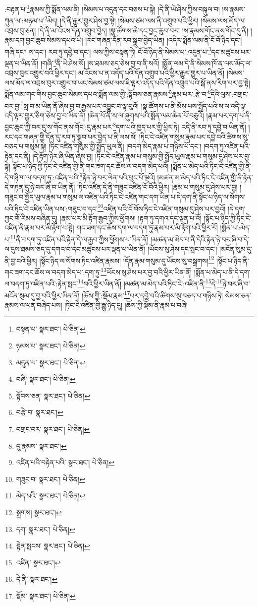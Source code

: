 :བརྟན་པ་\footnote{བསྟན་པ་  སྣར་ཐང་།  པེ་ཅིན། }རྣམས་ཀྱི་སྨོན་ལམ་ནི། །སེམས་པ་འདུན་དང་བཅས་པ་སྟེ། །དེ་ནི་ཡེ་ཤེས་ཀྱིས་བསྐུལ་བ། །ས་རྣམས་ཀུན་ལ་:མཉམ་པ་\footnote{ཉམས་པ་  སྣར་ཐང་།  པེ་ཅིན། }མེད། །དེ་ནི་རྒྱུར་གྱུར་ཤེས་བྱ་སྟེ། །སེམས་ཙམ་ལས་ནི་འགྲུབ་པའི་ཕྱིར། །སེམས་ལས་མོད་ལ་འབྲས་བུ་ཅན། །དེ་ནི་མ་འོངས་དོན་འགྲུབ་བྱེད། །སྣ་ཚོགས་ཆེ་དང་བྱང་ཆུབ་བར། །ས་རྣམས་གོང་ནས་གོང་དུ་ནི། །
རྣམ་དག་བྱང་ཆུབ་སེམས་དཔའ་ཡི། །རང་གཞན་དོན་རབ་སྒྲུབ་བྱེད་ཡིན། །འདིར་སྨོན་ལམ་ནི་ངོ་བོ་ཉིད་དང་། གཞི་དང་། ས་དང་། རབ་ཏུ་དབྱེ་བ་དང་། ལས་ཀྱིས་བསྟན་ཏེ། ངོ་བོ་ཉིད་ནི་སེམས་པ་:འདུན་པ་\footnote{མདུན་པ་  སྣར་ཐང་།  པེ་ཅིན། }དང་མཚུངས་པར་ལྡན་པ་ཡིན་ནོ། །གཞི་\footnote{བཞི་  སྣར་ཐང་།  པེ་ཅིན། }ནི་ཡེ་ཤེས་སོ། །ས་ཐམས་ཅད་ཅེས་བྱ་བ་ནི་སའོ། །སྨོན་ལམ་དེ་ནི་སེམས་ཁོ་ན་ལས་མོད་ལ་འབྲས་བུར་འགྱུར་བའི་ཕྱིར་དང་། མ་འོངས་པ་ན་འདོད་པའི་དོན་འགྲུབ་པའི་ཕྱིར་རྒྱུར་གྱུར་པ་ཡིན་ནོ། །སེམས་ལས་མོད་ལ་འབྲས་བུར་འགྱུར་བ་ཡང་སེམས་ཙམ་ལས་ཇི་ལྟར་འདོད་པའི་དོན་འགྲུབ་པའི་སྒོ་ནས་རིག་པར་བྱ་སྟེ། སྨོན་ལམ་གང་གིས་བྱང་ཆུབ་སེམས་དཔའ་སྨོན་ལམ་གྱི་:སྟོབས་ཅན་རྣམས་\footnote{སྟོབས་ཅན་  སྣར་ཐང་།  པེ་ཅིན། }རྣམ་པར་:རྩེ་བ་\footnote{བརྩེ་བ་  སྣར་ཐང་། }དེའི་ལུས་:བགྲང་བར་བྱ་\footnote{བགྲང་བར་  སྣར་ཐང་།  པེ་ཅིན། }སླ་བ་མ་ཡིན་ནོ་ཞེས་བྱ་བ་རྒྱས་པར་འབྱུང་བ་ལྟ་བུའོ། །སྣ་ཚོགས་པ་ནི་མོས་པས་སྤྱོད་པའི་ས་ལ་འདི་ལྟ་འདི་ལྟར་གྱུར་ཅིག་ཅེས་བྱ་བ་ཡིན་ནོ། །ཆེན་པོ་ནི་ས་ལ་ཞུགས་པའི་སྨོན་ལམ་ཆེན་པོ་བཅུའོ། །རྣམ་པར་དག་པ་ནི་བྱང་ཆུབ་ཀྱི་བར་དུ་ས་གོང་ནས་གོང་:དུ་རྣམ་པར་\footnote{དུ་རྣམས་  སྣར་ཐང་། }དག་པའི་ཁྱད་པར་གྱི་ཕྱིར་ཏེ། འདི་ནི་རབ་ཏུ་དབྱེ་བ་ཡིན་ནོ། །རང་དང་གཞན་གྱི་དོན་དུ་རབ་ཏུ་སྒྲུབ་པར་བྱེད་པ་ནི་ལས་སོ། །ཏིང་ངེ་འཛིན་གསུམ་རྣམ་པར་དབྱེ་བའི་ཚིགས་སུ་བཅད་པ་གསུམ་སྟེ། །ཏིང་འཛིན་གསུམ་གྱི་སྤྱོད་ཡུལ་ནི། །བདག་མེད་རྣམ་པ་གཉིས་པོ་དང་། །བདག་ཏུ་འཛིན་པའི་རྟེན་དང་ནི། །དེ་རྟོག་ཉེར་ཞི་ཡིན་ཞེས་བྱ། །ཏིང་ངེ་འཛིན་རྣམ་པ་གསུམ་གྱི་སྤྱོད་ཡུལ་རྣམ་པ་གསུམ་དུ་ཤེས་པར་བྱ་སྟེ། སྟོང་པ་ཉིད་ཀྱི་ཏིང་ངེ་འཛིན་གྱི་ནི་གང་ཟག་དང་ཆོས་ལ་བདག་མེད་པའོ། །སྨོན་པ་མེད་པའི་ཏིང་ངེ་འཛིན་གྱི་ནི་དེ་གཉི་ག་ལ་བདག་ཏུ་:འཛིན་པའི་\footnote{འཛིན་པའི་བརྟེན་པའི་  སྣར་ཐང་།  པེ་ཅིན། }རྟེན་ཉེ་བར་ལེན་པའི་ཕུང་པོ་ལྔའོ། །མཚན་མ་མེད་པའི་ཏིང་ངེ་འཛིན་གྱི་ནི་རྟེན་དེ་གཏན་དུ་ཉེ་བར་ཞི་བ་ཡིན་ནོ། །ཏིང་འཛིན་དེ་ནི་གཟུང་འཛིན་ངོ་བོའི་ཕྱིར། །རྣམ་པ་གསུམ་དུ་ཤེས་པར་བྱ། །གཟུང་བ་སྤྱོད་ཡུལ་རྣམ་པ་གསུམ་ལ་འཛིན་པའི་ཏིང་ངེ་འཛིན་གང་དག་ཡིན་པ་དེ་དག་ནི་སྟོང་པ་ཉིད་ལ་སོགས་པའི་ཏིང་ངེ་འཛིན་ཡིན་པས་:གཟུང་བ་དང་\footnote{གཟུང་བ་  སྣར་ཐང་།  པེ་ཅིན། }འཛིན་པའི་ངོ་བོས་ཏིང་ངེ་འཛིན་གསུམ་དུ་ཤེས་པར་བྱའོ། །དེ་དག་ཀྱང་གོ་རིམས་བཞིན་དུ། །རྣམ་པར་མི་རྟོག་རྒྱབ་ཀྱིས་ཕྱོགས། །རྟག་ཏུ་དགའ་དང་ལྡན་པ་འོ། །སྟོང་པ་ཉིད་ཀྱི་ཏིང་ངེ་འཛིན་ནི་རྣམ་པར་མི་རྟོག་པ་སྟེ། གང་ཟག་དང་ཆོས་དག་ལ་བདག་ཏུ་རྣམ་པར་མི་རྟོག་པའི་ཕྱིར་རོ། །སྨོན་པ་:མེད་པ་\footnote{མེད་པའི་  སྣར་ཐང་།  པེ་ཅིན། }ནི་བདག་ཏུ་འཛིན་པའི་རྟེན་དེ་ལ་རྒྱབ་ཀྱིས་ཕྱོགས་པ་ཡིན་ནོ། །མཚན་མ་མེད་པ་ནི་དེའི་རྟེན་ཉེ་བར་ཞི་བ་དེ་ལ་དུས་ཐམས་ཅད་དུ་དགའ་བ་དང་མཚུངས་པར་ལྡན་པ་ཡིན་ནོ། །ཡོངས་སུ་ཤེས་དང་སྤང་བ་དང་། །མངོན་སུམ་དུ་ནི་བྱ་བའི་ཕྱིར། །སྟོང་ཉིད་ལ་སོགས་ཏིང་འཛིན་རྣམས། །དོན་རྣམ་གསུམ་དུ་ཡོངས་སུ་བསྒྲགས།\footnote{སྒྲགས།  སྣར་ཐང་། } །སྟོང་པ་ཉིད་ནི་གང་ཟག་དང་ཆོས་ལ་བདག་མེད་པ་:དག་ཏུ་\footnote{དག་  སྣར་ཐང་།  པེ་ཅིན། }ཡོངས་སུ་ཤེས་པར་བྱ་བའི་ཕྱིར་ཡིན་ནོ། །སྨོན་པ་མེད་པ་ནི་དེ་དག་ལ་བདག་ཏུ་འཛིན་པའི་:རྟེན་སྤང་\footnote{སྟེན་སྤངས་  སྣར་ཐང་།  པེ་ཅིན། }བའི་ཕྱིར་ཡིན་ནོ། །མཚན་མ་མེད་པའི་ཏིང་ངེ་:འཛིན་ནི་\footnote{འཛིན་  སྣར་ཐང་། }དེ་\footnote{དེ་ནི་  སྣར་ཐང་། }ཉེ་བར་ཞི་བ་མངོན་སུམ་དུ་བྱ་བའི་ཕྱིར་ཡིན་ནོ། །ཆོས་ཀྱི་:སྡོམ་རྣམ་\footnote{སྡོམ་  སྣར་ཐང་།  པེ་ཅིན། }པར་དབྱེ་བའི་ཚིགས་སུ་བཅད་པ་གཉིས་ཏེ། སེམས་ཅན་རྣམས་ལ་ཕན་བཞེད་པས། །ཏིང་ངེ་འཛིན་གྱི་རྒྱུ་ཉིད་དུ། །ཆོས་ཀྱི་སྡོམ་ནི་རྣམ་པ་བཞི། 